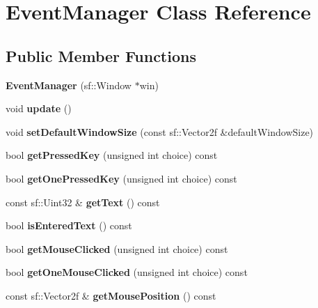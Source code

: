 \section{Event\-Manager Class Reference}
\label{class_event_manager}
\subsection*{Public Member Functions}
\begin{DoxyCompactItemize}
\item 
{\bfseries Event\-Manager} (sf\-::\-Window $\ast$win)\label{class_event_manager_a7ffebe839596c51649b406b5e1ad19a3}

\item 
void {\bfseries update} ()\label{class_event_manager_a475866e72256acf59a034c824d128d14}

\item 
void {\bfseries set\-Default\-Window\-Size} (const sf\-::\-Vector2f \&default\-Window\-Size)\label{class_event_manager_ab6ae7b73f0810b1c4d58773accdf115b}

\item 
bool {\bfseries get\-Pressed\-Key} (unsigned int choice) const \label{class_event_manager_a3e94ffa58a1f91568e8fda18c5b6031f}

\item 
bool {\bfseries get\-One\-Pressed\-Key} (unsigned int choice) const \label{class_event_manager_a7802e63b7c8f6e619dc87de72b67fd62}

\item 
const sf\-::\-Uint32 \& {\bfseries get\-Text} () const \label{class_event_manager_af5caf53169dd5f85d8015bc4f366e000}

\item 
bool {\bfseries is\-Entered\-Text} () const \label{class_event_manager_a68c9dd455d1acfc695cc6dfdef60ac1b}

\item 
bool {\bfseries get\-Mouse\-Clicked} (unsigned int choice) const \label{class_event_manager_aff4af9d49afa873a6d89d6b517ad2ae2}

\item 
bool {\bfseries get\-One\-Mouse\-Clicked} (unsigned int choice) const \label{class_event_manager_a2f16f032fe179549bc856bf7db361e19}

\item 
const sf\-::\-Vector2f \& {\bfseries get\-Mouse\-Position} () const \label{class_event_manager_a45c50825a63f17baec6ac685a466acad}


\end{DoxyCompactItemize}
